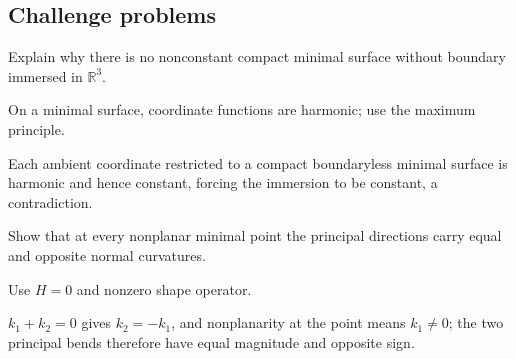 \subsection*{Challenge problems}

\begin{exercise}\label{exr:vii19-ped-15}
Explain why there is no nonconstant compact minimal surface without boundary immersed in \(\mathbb R^3\).
\end{exercise}
\begin{hint}
On a minimal surface, coordinate functions are harmonic; use the maximum principle.
\end{hint}
\begin{solution}
Each ambient coordinate restricted to a compact boundaryless minimal surface is harmonic and hence constant, forcing the immersion to be constant, a contradiction.
\end{solution}

\begin{exercise}\label{exr:vii19-ped-16}
Show that at every nonplanar minimal point the principal directions carry equal and opposite normal curvatures.
\end{exercise}
\begin{hint}
Use \(H=0\) and nonzero shape operator.
\end{hint}
\begin{solution}
\(k_1+k_2=0\) gives \(k_2=-k_1\), and nonplanarity at the point means \(k_1\neq0\); the two principal bends therefore have equal magnitude and opposite sign.
\end{solution}


